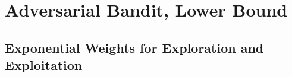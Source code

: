 \clearpage
\section{Adversarial Bandit, Lower Bound} %

\subsection{Exponential Weights for Exploration and Exploitation} %
